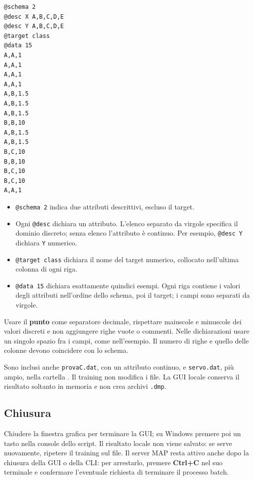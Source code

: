 \begin{lstlisting}
@schema 2
@desc X A,B,C,D,E
@desc Y A,B,C,D,E
@target class
@data 15
A,A,1
A,A,1
A,A,1
A,A,1
A,B,1.5
A,B,1.5
A,B,1.5
B,B,10
A,B,1.5
A,B,1.5
B,C,10
B,B,10
B,C,10
B,C,10
A,A,1
\end{lstlisting}

\begin{itemize}
  \item \texttt{@schema 2} indica due attributi descrittivi, escluso il target.
  \item Ogni \texttt{@desc} dichiara un attributo. L'elenco separato da
        virgole specifica il dominio discreto; senza elenco l'attributo è
        continuo. Per esempio, \texttt{@desc Y} dichiara \texttt{Y} numerico.
  \item \texttt{@target class} dichiara il nome del target numerico,
        collocato nell'ultima colonna di ogni riga.
  \item \texttt{@data 15} dichiara esattamente quindici esempi. Ogni riga
        contiene i valori degli attributi nell'ordine dello schema, poi
        il target; i campi sono separati da virgole.
\end{itemize}

Usare il \textbf{punto} come separatore decimale, rispettare maiuscole e
minuscole dei valori discreti e non aggiungere righe vuote o commenti.
Nelle dichiarazioni usare un singolo spazio fra i campi, come nell'esempio.
Il numero di righe e quello delle colonne devono coincidere con lo schema.

Sono inclusi anche \texttt{provaC.dat}, con un attributo continuo, e
\texttt{servo.dat}, più ampio, nella cartella .
Il training non modifica i file. La GUI locale conserva il risultato
soltanto in memoria e non crea archivi \texttt{.dmp}.

\subsection*{Chiusura}

Chiudere la finestra grafica per terminare la GUI; su Windows premere poi un
tasto nella console dello script. Il risultato locale non viene salvato:
se serve nuovamente, ripetere il training sul file.
Il server MAP resta attivo anche dopo la chiusura della GUI o della CLI:
per arrestarlo, premere \textbf{Ctrl+C} nel suo terminale e confermare
l'eventuale richiesta di terminare il processo batch.
